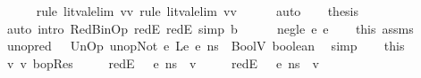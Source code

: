 \begin{isabellebody}
\ \ \ \ \isamarkupfalse%
\ {\isacharparenleft}{\kern0pt}rule\ lit{\isacharunderscore}{\kern0pt}val{\isacharunderscore}{\kern0pt}elim{\isacharbrackleft}{\kern0pt}\ v{\isacharequal}{\kern0pt}v{}{\isacharbrackright}{\kern0pt}{\isacharsemicolon}{\kern0pt}\ rule\ lit{\isacharunderscore}{\kern0pt}val{\isacharunderscore}{\kern0pt}elim{\isacharbrackleft}{\kern0pt}\ v{\isacharequal}{\kern0pt}v{}{\isacharbrackright}{\kern0pt}{\isacharparenright}{\kern0pt}\isanewline
\ \ \ \ \isamarkupfalse%
\ auto\isanewline
\isanewline
\ \ \isamarkupfalse%
\ {\isacharquery}{\kern0pt}thesis\isanewline
\ \ \ \ \isamarkupfalse%
\ {\isacharparenleft}{\kern0pt}auto\ intro{\isacharcolon}{\kern0pt}\ RedBinOp\ redE{}\ redE{}\ simp{\isacharcolon}{\kern0pt}\ {\isacartoucheopen}b\ {\isacharequal}{\kern0pt}\ {\isacharunderscore}{\kern0pt}{\isacartoucheclose}{\isacharparenright}{\kern0pt}\isanewline
{}\isamarkupfalse%
\isanewline
\ \ \isamarkupfalse%
\ {\isacharparenleft}{\kern0pt}neg{\isacharunderscore}{\kern0pt}le\ e{}\ e{}{\isacharparenright}{\kern0pt}\isanewline
\ \ \isamarkupfalse%
\ this\ assms\ \isamarkupfalse%
\ unop{\isacharunderscore}{\kern0pt}red{\isacharcolon}{\kern0pt}\ {\isachardoublequoteopen}{\isasymLambda}{\isacharcomma}{\kern0pt}{\isasymGamma}{\isacharcomma}{\kern0pt}{\isasymOmega}\ {\isasymturnstile}\ {\isasymlangle}UnOp\ unop{\isachardot}{\kern0pt}Not\ {\isacharparenleft}{\kern0pt}e{}\ {\isasymguillemotleft}Le{\isasymguillemotright}\ e{}{\isacharparenright}{\kern0pt}{\isacharcomma}{\kern0pt}\ ns{\isasymrangle}\ {\isasymDown}\ BoolV\ boolean{\isachardoublequoteclose}\ \isamarkupfalse%
\ simp\isanewline
\ \ \isamarkupfalse%
\ this\ \isamarkupfalse%
\ v{}\ v{}\ bopRes\ \isanewline
\ \ \ \ redE{}{\isacharcolon}{\kern0pt}\ {\isachardoublequoteopen}{\isasymLambda}{\isacharcomma}{\kern0pt}{\isasymGamma}{\isacharcomma}{\kern0pt}{\isasymOmega}\ {\isasymturnstile}\ {\isasymlangle}e{}{\isacharcomma}{\kern0pt}\ ns{\isasymrangle}\ {\isasymDown}\ v{}{\isachardoublequoteclose}\ \isanewline
\ \ \ \ redE{}{\isacharcolon}{\kern0pt}\ {\isachardoublequoteopen}{\isasymLambda}{\isacharcomma}{\kern0pt}{\isasymGamma}{\isacharcomma}{\kern0pt}{\isasymOmega}\ {\isasymturnstile}\ {\isasymlangle}e{}{\isacharcomma}{\kern0pt}\ ns{\isasymrangle}\ {\isasymDown}\ v{}{\isachardoublequoteclose}\ \isanewline

\end{isabellebody}
